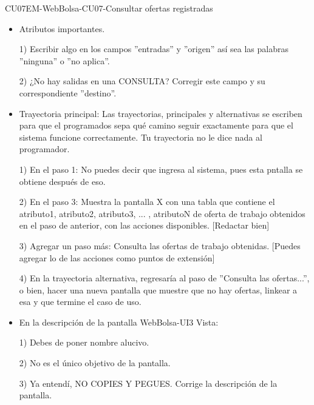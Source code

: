 \begin{UseCase}{CU07}{EM-WebBolsa-CU07-Consultar ofertas registradas}
{\begin{itemize}
						1) Escribir un resumen más completo.

						2) Faltas de ortografía en párrafo 1: podra => podrá, aun => aún.
				\item Atributos importantes.

						1) Escribir algo en los campos ''entradas'' y ''origen'' así sea las palabras ''ninguna'' o ''no aplica''.

						2) ¿No hay salidas en una CONSULTA? Corregir este campo y su correspondiente ''destino''.
				\item Trayectoria principal: Las trayectorias, principales y alternativas se escriben para que el programados sepa qué camino seguir exactamente para que el sistema funcione correctamente. Tu trayectoria no le dice nada al programador. 

						1) En el paso 1: No puedes decir que ingresa al sistema, pues esta pntalla se obtiene después de eso. 

						2) En el paso 3: Muestra la pantalla X con una tabla que contiene el atributo1, atributo2, atributo3, ... , 
						atributoN de oferta de trabajo obtenidos en el paso de anterior, con las acciones disponibles. [Redactar bien]

						3) Agregar un paso más: Consulta las ofertas de trabajo obtenidas. [Puedes agregar lo de las acciones como puntos de extensión]

						4) En la trayectoria alternativa, regresaría al paso de ''Consulta las ofertas...'', o bien, hacer una nueva pantalla que muestre que no hay ofertas, linkear a esa y que termine el caso de uso.  

				\item En la descripción de la pantalla WebBolsa-UI3 Vista:

						1) Debes de poner nombre alucivo.

						2) No es el único objetivo de la pantalla. 
						
						3) Ya entendí, NO COPIES Y PEGUES. Corrige la descripción de la pantalla.
			\end{itemize}
		
		
 		}
	\end{UseCase}
	\newpage
	
